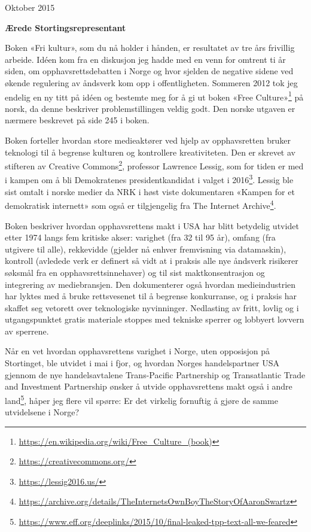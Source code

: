 \documentclass[a4paper, 11pt, norsk]{article}
\begin{document}
\begin{flushright} Oktober 2015 \end{flushright}

{\bf Ærede Stortingsrepresentant}

Boken «Fri kultur», som du nå holder i hånden, er resultatet av tre
års frivillig arbeide.  Idéen kom fra en diskusjon jeg hadde med en
venn for omtrent ti år siden, om opphavsrettsdebatten i Norge og hvor
sjelden de negative sidene ved økende regulering av åndsverk kom opp i
offentligheten.  Sommeren 2012 tok jeg endelig en ny titt på idéen og
bestemte meg for å gi ut boken «Free
  Culture»\footnote{\url{https://en.wikipedia.org/wiki/Free_Culture_(book)}}
på norsk, da denne beskriver problemstillingen veldig godt.  Den
norske utgaven er nærmere beskrevet på side 245 i boken.

Boken forteller hvordan store medieaktører ved hjelp av opphavsretten
bruker teknologi til å begrense kulturen og kontrollere kreativiteten.
Den er skrevet av stifteren av Creative
Commons\footnote{\url{https://creativecommons.org/}}, professor
Lawrence Lessig, som for tiden er med i kampen om å bli Demokratenes
presidentkandidat i valget i
2016\footnote{\url{https://lessig2016.us/}}.  Lessig ble sist omtalt i
norske medier da NRK i høst viste dokumentaren «Kampen for et
  demokratisk internett» som også er tilgjengelig fra The Internet
Archive\footnote{\url{https://archive.org/details/TheInternetsOwnBoyTheStoryOfAaronSwartz}}.

Boken beskriver hvordan opphavsrettens makt i USA har blitt betydelig
utvidet etter 1974 langs fem kritiske akser: varighet (fra 32 til 95
år), omfang (fra utgivere til alle), rekkevidde (gjelder nå enhver
fremvisning via datamaskin), kontroll (avledede verk er definert så
vidt at i praksis alle nye åndsverk risikerer søksmål fra en
opphavsrettsinnehaver) og til sist maktkonsentrasjon og integrering av
mediebransjen.  Den dokumenterer også hvordan medieindustrien har
lyktes med å bruke rettsvesenet til å begrense konkurranse, og i
praksis har skaffet seg vetorett over teknologiske nyvinninger.
Nedlasting av fritt, lovlig og i utgangspunktet gratis materiale
stoppes med tekniske sperrer og lobbyert lovvern av sperrene.

Når en vet hvordan opphavsrettens varighet i Norge, uten opposisjon på
Stortinget, ble utvidet i mai i fjor, og hvordan Norges handelspartner
USA gjennom de nye handelsavtalene Trans-Pacific Partnership og
Transatlantic Trade and Investment Partnership ønsker å utvide
opphavsrettens makt også i andre
land\footnote{\url{https://www.eff.org/deeplinks/2015/10/final-leaked-tpp-text-all-we-feared}},
håper jeg flere vil spørre: Er det virkelig fornuftig å gjøre de samme
utvidelsene i Norge?
\end{document}
